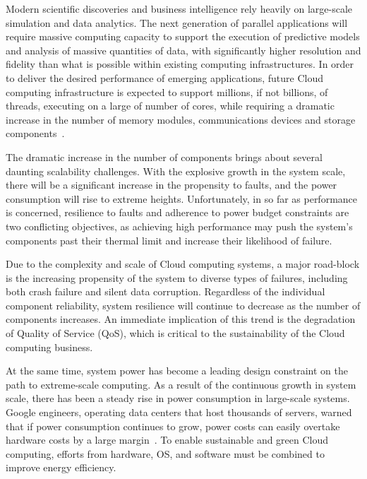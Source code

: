 Modern scientific discoveries and business intelligence rely heavily on large-scale
simulation and data analytics. The next generation of parallel applications will require massive computing capacity to support the execution of predictive models and analysis of massive quantities of
data, with significantly higher resolution and fidelity than what is possible within existing computing infrastructures. 
In order to deliver the desired performance of emerging 
applications, future Cloud computing infrastructure is
expected to support millions, if not billions, of threads,
executing on a large of number of cores, while
requiring a dramatic increase in the number of memory
modules, communications devices and storage components~\cite{Bergman08exascalecomputing}.

The dramatic increase in the number of components brings about several daunting scalability challenges. With the explosive growth in the system scale, there will be a significant increase in the propensity to faults, and the power consumption will rise to extreme heights. Unfortunately, in so far as performance is concerned,
resilience to faults and adherence to power budget constraints are two conflicting objectives, as achieving high
performance may push the system’s components past their thermal limit and increase their likelihood of failure. 

Due to the complexity and scale of Cloud computing systems, a major road-block is the increasing propensity of the system to diverse types of failures, including both crash failure and silent data corruption.
Regardless of the individual component reliability, system resilience will continue to decrease as the number of components increases. 
An immediate implication of this trend is the degradation of Quality of Service (QoS), which is critical to the sustainability of the Cloud computing business.

At the same time, system power has become a leading design constraint on the path to extreme-scale computing. As a result of the continuous growth in system scale, there has been a steady rise in power consumption in large-scale systems. 
Google engineers, operating data centers that host thousands of servers, warned that if power consumption continues to grow, power costs can easily overtake hardware costs by a large margin~\cite{barroso2005price}. 
To enable sustainable and green Cloud computing, 
efforts from hardware, OS, and software must be combined to improve energy efficiency.

